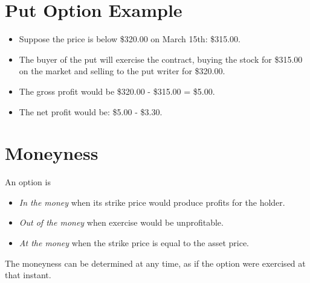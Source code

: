 \documentclass[letterpaper,10pt,english]{sphinxmanual}
\begin{document}
\section{Put Option Example}
\label{options:id6}\begin{itemize}
\item {} 
Suppose the price is below \$320.00 on March 15th: \$315.00.

\end{itemize}
\begin{itemize}
\item {} 
The buyer of the put will exercise the contract, buying the stock
for \$315.00 on the market and selling to the put writer for
\$320.00.

\end{itemize}
\begin{itemize}
\item {} 
The gross profit would be \$320.00 - \$315.00 = \$5.00.

\end{itemize}
\begin{itemize}
\item {} 
The net profit would be: \$5.00 - \$3.30.

\end{itemize}


\section{Moneyness}
\label{options:moneyness}
An option is
\begin{itemize}
\item {} 
\emph{In the money} when its strike price would produce profits for the
holder.

\end{itemize}
\begin{itemize}
\item {} 
\emph{Out of the money} when exercise would be unprofitable.

\end{itemize}
\begin{itemize}
\item {} 
\emph{At the money} when the strike price is equal to the asset price.

\end{itemize}

The moneyness can be determined at any time, as if the option were
exercised at that instant.
\end{document}
